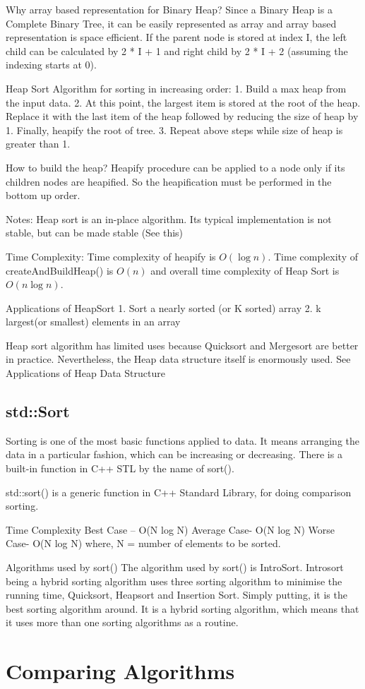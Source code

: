 \documentclass{article}
\begin{document}
Why array based representation for Binary Heap?
Since a Binary Heap is a Complete Binary Tree, it can be easily represented as array and array based representation is space efficient. If the parent node is stored at index I, the left child can be calculated by 2 * I + 1 and right child by 2 * I + 2 (assuming the indexing starts at 0).

Heap Sort Algorithm for sorting in increasing order:
1. Build a max heap from the input data.
2. At this point, the largest item is stored at the root of the heap. Replace it with the last item of the heap followed by reducing the size of heap by 1. Finally, heapify the root of tree.
3. Repeat above steps while size of heap is greater than 1.

How to build the heap?
Heapify procedure can be applied to a node only if its children nodes are heapified. So the heapification must be performed in the bottom up order.



Notes:
Heap sort is an in-place algorithm.
Its typical implementation is not stable, but can be made stable (See this)

Time Complexity: Time complexity of heapify is $O(\log n)$. Time complexity of createAndBuildHeap() is $O(n)$ and overall time complexity of Heap Sort is $O(n\log n).$

Applications of HeapSort
1. Sort a nearly sorted (or K sorted) array
2. k largest(or smallest) elements in an array

Heap sort algorithm has limited uses because Quicksort and Mergesort are better in practice. Nevertheless, the Heap data structure itself is enormously used. See Applications of Heap Data Structure



\subsection{std::Sort}

Sorting is one of the most basic functions applied to data. It means arranging the data in a particular fashion, which can be increasing or decreasing. There is a built-in function in C++ STL by the name of sort().

std::sort() is a generic function in C++ Standard Library, for doing comparison sorting.


Time Complexity
Best Case – O(N log N)
Average Case- O(N log N)
Worse Case- O(N log N)
where, N = number of elements to be sorted.

Algorithms used by sort()
The algorithm used by sort() is IntroSort. Introsort being a hybrid sorting algorithm uses three sorting algorithm to minimise the running time, Quicksort, Heapsort and Insertion Sort. Simply putting, it is the best sorting algorithm around. It is a hybrid sorting algorithm, which means that it uses more than one sorting algorithms as a routine.




\section{Comparing Algorithms}
\end{document}
